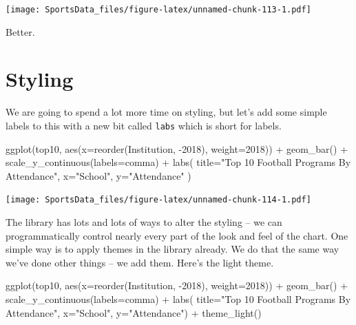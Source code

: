 \documentclass[
]{book}
\newenvironment{Shaded}{\begin{snugshade}}{\end{snugshade}}
\newcommand{\AttributeTok}[1]{\textcolor[rgb]{0.77,0.63,0.00}{#1}}
\newcommand{\FunctionTok}[1]{\textcolor[rgb]{0.00,0.00,0.00}{#1}}
\newcommand{\NormalTok}[1]{#1}
\newcommand{\SpecialCharTok}[1]{\textcolor[rgb]{0.00,0.00,0.00}{#1}}
\newcommand{\StringTok}[1]{\textcolor[rgb]{0.31,0.60,0.02}{#1}}
\begin{document}
\texttt{[image: SportsData\_files/figure-latex/unnamed-chunk-113-1.pdf]}

Better.

\hypertarget{styling}{%
\section{Styling}\label{styling}}

We are going to spend a lot more time on styling, but let's add some simple labels to this with a new bit called \texttt{labs} which is short for labels.

\begin{Shaded}
\begin{Highlighting}[]
\FunctionTok{ggplot}\NormalTok{(top10, }\FunctionTok{aes}\NormalTok{(}\AttributeTok{x=}\FunctionTok{reorder}\NormalTok{(Institution, }\SpecialCharTok{{-}}\StringTok{\textasciigrave{}}\AttributeTok{2018}\StringTok{\textasciigrave{}}\NormalTok{), }\AttributeTok{weight=}\StringTok{\textasciigrave{}}\AttributeTok{2018}\StringTok{\textasciigrave{}}\NormalTok{)) }\SpecialCharTok{+} 
  \FunctionTok{geom\_bar}\NormalTok{() }\SpecialCharTok{+} 
  \FunctionTok{scale\_y\_continuous}\NormalTok{(}\AttributeTok{labels=}\NormalTok{comma) }\SpecialCharTok{+} 
  \FunctionTok{labs}\NormalTok{(}
    \AttributeTok{title=}\StringTok{"Top 10 Football Programs By Attendance"}\NormalTok{, }
    \AttributeTok{x=}\StringTok{"School"}\NormalTok{, }
    \AttributeTok{y=}\StringTok{"Attendance"}
\NormalTok{)}
\end{Highlighting}
\end{Shaded}

\texttt{[image: SportsData\_files/figure-latex/unnamed-chunk-114-1.pdf]}

The library has lots and lots of ways to alter the styling -- we can programmatically control nearly every part of the look and feel of the chart. One simple way is to apply themes in the library already. We do that the same way we've done other things -- we add them. Here's the light theme.

\begin{Shaded}
\begin{Highlighting}[]
\FunctionTok{ggplot}\NormalTok{(top10, }\FunctionTok{aes}\NormalTok{(}\AttributeTok{x=}\FunctionTok{reorder}\NormalTok{(Institution, }\SpecialCharTok{{-}}\StringTok{\textasciigrave{}}\AttributeTok{2018}\StringTok{\textasciigrave{}}\NormalTok{), }\AttributeTok{weight=}\StringTok{\textasciigrave{}}\AttributeTok{2018}\StringTok{\textasciigrave{}}\NormalTok{)) }\SpecialCharTok{+} 
  \FunctionTok{geom\_bar}\NormalTok{() }\SpecialCharTok{+} 
  \FunctionTok{scale\_y\_continuous}\NormalTok{(}\AttributeTok{labels=}\NormalTok{comma) }\SpecialCharTok{+} 
  \FunctionTok{labs}\NormalTok{(}
    \AttributeTok{title=}\StringTok{"Top 10 Football Programs By Attendance"}\NormalTok{, }
    \AttributeTok{x=}\StringTok{"School"}\NormalTok{, }
    \AttributeTok{y=}\StringTok{"Attendance"}\NormalTok{) }\SpecialCharTok{+} 
  \FunctionTok{theme\_light}\NormalTok{()}
\end{Highlighting}
\end{Shaded}
\end{document}
